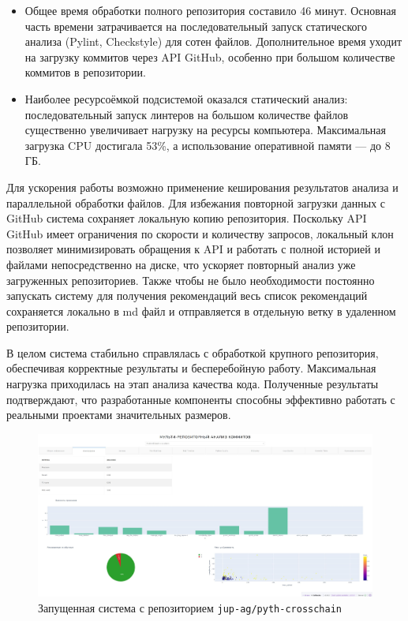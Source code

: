 \begin{itemize}
	\item Общее время обработки полного репозитория составило 46 минут. Основная часть времени затрачивается на последовательный запуск статического анализа (Pylint, Checkstyle) для сотен файлов. Дополнительное время уходит на загрузку коммитов через API GitHub, особенно при большом количестве коммитов в репозитории.
	
	\item Наиболее ресурсоёмкой подсистемой оказался статический анализ: последовательный запуск линтеров на большом количестве файлов существенно увеличивает нагрузку на ресурсы компьютера. Максимальная загрузка CPU достигала 53\%, а использование оперативной памяти — до 8 ГБ.
\end{itemize}
Для ускорения работы возможно применение кеширования результатов анализа и параллельной обработки файлов. Для избежания повторной загрузки данных с GitHub система сохраняет локальную копию репозитория. Поскольку API GitHub имеет ограничения по скорости и количеству запросов, локальный клон позволяет минимизировать обращения к API и работать с полной историей и файлами непосредственно на диске, что ускоряет повторный анализ уже загруженных репозиториев. Также чтобы не было необходимости постоянно запускать систему для получения рекомендаций весь список рекомендаций сохраняется локально в md файл и отправляется в отдельную ветку в удаленном репозитории.


В целом система стабильно справлялась с обработкой крупного репозитория, обеспечивая корректные результаты и бесперебойную работу. Максимальная нагрузка приходилась на этап анализа качества кода. Полученные результаты подтверждают, что разработанные компоненты способны эффективно работать с реальными проектами значительных размеров.

\begin{figure}[ht]
	\centering
	\includegraphics[width=\textwidth]{my_folder/images/nagruzka.png}
	\caption{Запущенная система с репозиторием \texttt{jup-ag/pyth-crosschain}}
	\label{tab:nagruzka}
\end{figure}

